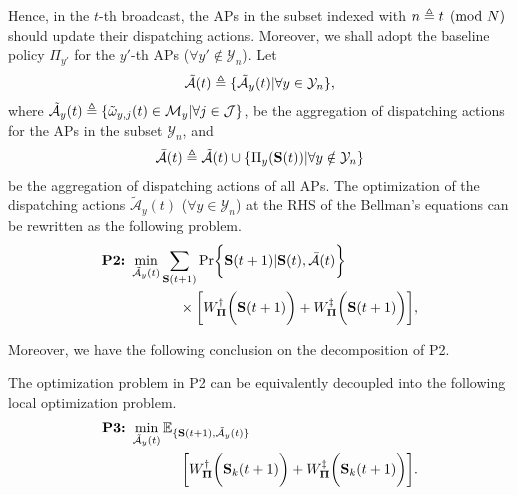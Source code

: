 Hence, in the $t$-th broadcast, the APs in the subset indexed with $n \triangleq t \pmod{N}$ should update their dispatching actions.
Moreover, we shall adopt the baseline policy $\Pi_{y'}$ for the $y'$-th APs ($\forall y' \notin \mathcal{Y}_{n}$).
Let
\begin{align}
    \tilde{\mathcal{A}}(t) \triangleq \{\tilde{\mathcal{A}}_{y}(t) | \forall y\in\mathcal{Y}_{n}\},
\end{align}
where $\tilde{\mathcal{A}}_{y}(t) \triangleq \{ \tilde{\omega}_{y,j}(t)\in \mathcal{M}_{y}|\forall j\in\mathcal{J} \}$, 
be the aggregation of dispatching actions for the APs in the subset $\mathcal{Y}_{n}$, and
\begin{align}
    \bar{\mathcal{A}}(t) \triangleq \tilde{\mathcal{A}}(t) \cup \{\Pi_{y}(\mathbf{S}(t)) | \forall y\notin\mathcal{Y}_{n}\}
\end{align}
be the aggregation of dispatching actions of all APs.
The optimization of the dispatching actions $\tilde{\mathcal{A}}_{y}(t)$ ($\forall y\in\mathcal{Y}_{n}$) at the RHS of the Bellman's equations can be rewritten as the following problem.
{\small
\begin{align}
    \textbf{P2:}~
    \min_{ \tilde{\mathcal{A}}_{y}(t) }
    &\sum_{\Stat(t+1)} \Pr\Brace{
        \Stat(t+1) | \Stat(t), \bar{\mathcal{A}}(t)
    }
    \nonumber\\
    &~~~~
    \times \Bracket{
        W^{\AP}_{\Baseline} \Paren{\Stat(t+1)} +
        W^{\ES}_{\Baseline} \Paren{\Stat(t+1)}
    },
\end{align}
}

Moreover, we have the following conclusion on the decomposition of P2.
\begin{lemma}[]
    The optimization problem in P2 can be equivalently decoupled into the following local optimization problem.
    {\small
    \begin{align}
        \textbf{P3:}~
        &\min_{ \tilde{\mathcal{A}}_{y}(t) }
        \mathbb{E}_{\{ \mathbf{S}(t+1), \tilde{\mathcal{A}}_{y}(t) \}}
        \nonumber\\
        &~~~~~~~~~~~\bigg[
            W^{\dagger}_{ \boldsymbol{\Pi} }\bigg(\mathbf{S}_{k}(t+1)\bigg) +
            W^{\ddagger}_{ \boldsymbol{\Pi} }\bigg(\mathbf{S}_{k}(t+1)\bigg)
        \bigg].
        \label{eqn:partial}
    \end{align}
    }
\end{lemma}

